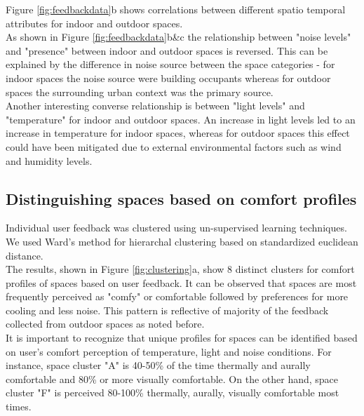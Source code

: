 Figure \ref{fig:feedbackdata}b shows correlations between different spatio temporal attributes for indoor and outdoor spaces.\\

As shown in Figure \ref{fig:feedbackdata}b\&c the relationship between "noise levels" and "presence" between indoor and outdoor spaces is reversed. This can be explained by the difference in noise source between the space categories - for indoor spaces the noise source were building occupants whereas for outdoor spaces the surrounding urban context was the primary source.\\

Another interesting converse relationship is between "light levels" and "temperature" for indoor and outdoor spaces. An increase in light levels led to an increase in temperature for indoor spaces, whereas for outdoor spaces this effect could have been mitigated due to external environmental factors such as wind and humidity levels.\\



\subsection{Distinguishing spaces based on comfort profiles}
\label{ch:userResults}

Individual user feedback was clustered using un-supervised learning techniques. We used Ward's method for hierarchal clustering based on standardized euclidean distance.\\

The results, shown in Figure \ref{fig:clustering}a, show 8 distinct clusters for comfort profiles of spaces based on user feedback. It can be observed that spaces are most frequently perceived as "comfy" or comfortable followed by preferences for more cooling and less noise. This pattern is reflective of majority of the feedback collected from outdoor spaces as noted before.\\

It is important to recognize that unique profiles for spaces can be identified based on user's comfort perception of temperature, light and noise conditions. For instance, space cluster "A" is 40-50\% of the time thermally and aurally comfortable and 80\% or more visually comfortable. On the other hand, space cluster "F" is perceived 80-100\% thermally, aurally, visually comfortable most times.\\           


